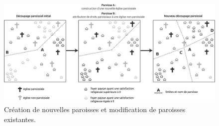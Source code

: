 \documentclass[12pt, a4paper, oneside]{book}
\begin{document}
	\begin{figure}[!h]
		\centering
		\includegraphics[width=1\linewidth]{src/Chapitre_TMD/Fig5}
		\caption{Création de nouvelles paroisses et modification de paroisses existantes.}
		\label{fig:fig5}
	\end{figure}
	
\end{document}
